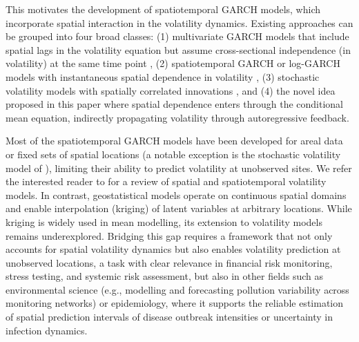 \documentclass[fleqn,11pt]{article}
\begin{document}
This motivates the development of spatiotemporal GARCH models, which incorporate spatial interaction in the volatility dynamics. Existing approaches can be grouped into four broad classes: (1) multivariate GARCH models that include spatial lags in the volatility equation but assume cross-sectional independence (in volatility) at the same time point \citep[e.g.,][]{borovkova2012spatial,caporin2015proximity,holleland2020stationary,billio2023networks}, (2) spatiotemporal GARCH or log-GARCH models with instantaneous spatial dependence in volatility \citep[e.g.,][]{sato2017spatial,sato2018spatial,sato2018spatiotemporal,otto2023general,otto2024dynamic}, (3) stochastic volatility models with spatially correlated innovations \citep{huang2011class}, and (4) the novel idea proposed in this paper where spatial dependence enters through the conditional mean equation, indirectly propagating volatility through autoregressive feedback. 

Most of the spatiotemporal GARCH models have been developed for areal data or fixed sets of spatial locations (a notable exception is the stochastic volatility model of \cite{huang2011class}), limiting their ability to predict volatility at unobserved sites. We refer the interested reader to \cite{otto2025spatial} for a review of spatial and spatiotemporal volatility models. In contrast, geostatistical models operate on continuous spatial domains and enable interpolation (kriging) of latent variables at arbitrary locations. While kriging is widely used in mean modelling, its extension to volatility models remains underexplored. Bridging this gap requires a framework that not only accounts for spatial volatility dynamics but also enables volatility prediction at unobserved locations, a task with clear relevance in financial risk monitoring, stress testing, and systemic risk assessment, but also in other fields such as environmental science (e.g., modelling and forecasting pollution variability across monitoring networks) or epidemiology, where it supports the reliable estimation of spatial prediction intervals of disease outbreak intensities or uncertainty in infection dynamics.
\end{document}
